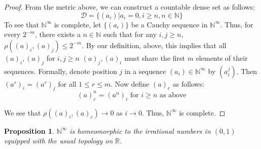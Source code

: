 \documentclass[12pt]{article}
\newtheorem{proposition}{Proposition}[section]
\theoremstyle{remark}
\begin{document}
\begin{proof}
 From the metric above, we can construct a countable dense set as follows:
 $$\mathcal{D} = \{ (a_i) \vert a_i = 0, i \geq n, n \in \mathbb{N} \} $$
 To see that $\mathbb{N}^{\infty}$ is complete, let $\{(a_i)\}$ be a Cauchy sequence in $\mathbb{N}^{\infty}$. Thus, for every $2^{-m}$, there exists a $n \in \mathbb{N}$ such that for any $i,j \geq n$, $\rho((a)_i,(a)_j) \leq 2^{-m}$. By our definition, above, this implies that all $(a)_i,(a)_j$ for $i,j \geq n$ $(a)_j, (a)_i$ must share the first $m$ elements of their sequences. Formally, denote position $j$ in a sequence $(a_i) \in \mathbb{N}^{\infty}$ by $(a_i^j)$.
 Then $(a^r)_i = (a^r)_j$ for all $1\leq r \leq m$. Now define $(a)_c$ as follows:
 $$(a)_c^n = (a^n)_i \text{ for $i \geq n$ as above}$$
 
 We see that $\rho((a)_i,(a)_c) \rightarrow 0$ as $i \rightarrow 0$. Thus, $\mathbb{N}^{\infty}$ is complete.
\end{proof}

\begin{proposition}
 $\mathbb{N}^{\infty}$ is homeomorphic to the irrational numbers in $(0,1)$ equipped with the usual topology on $\mathbb{R}$.
\end{proposition}
\end{document}
